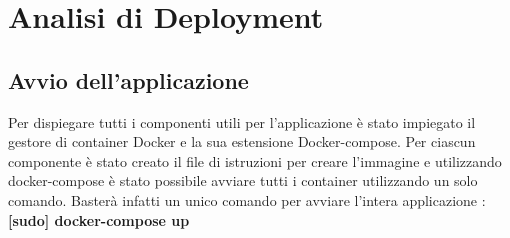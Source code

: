 

\chapter{Analisi di Deployment}
\section{Avvio dell'applicazione}
Per dispiegare tutti i componenti utili per l’applicazione è stato impiegato il
gestore di container Docker e la sua estensione Docker-compose.
Per ciascun componente è stato creato il file di istruzioni per creare l’immagine
e utilizzando docker-compose è stato possibile avviare tutti i container utilizzando un solo comando.
Basterà infatti un unico comando per avviare l'intera applicazione : \textbf{[sudo] docker-compose up}